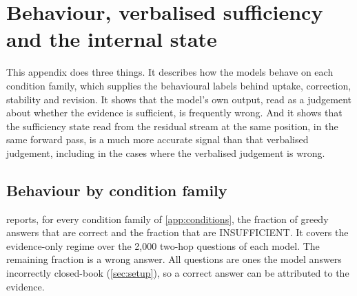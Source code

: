 \section{Behaviour, verbalised sufficiency and the internal state}
\label{app:behaviour}

This appendix does three things. It describes how the models behave on each condition family, which supplies the behavioural labels behind uptake, correction, stability and revision. It shows that the model's own output, read as a judgement about whether the evidence is sufficient, is frequently wrong. And it shows that the sufficiency state read from the residual stream at the same position, in the same forward pass, is a much more accurate signal than that verbalised judgement, including in the cases where the verbalised judgement is wrong.

\subsection{Behaviour by condition family}

 reports, for every condition family of \cref{app:conditions}, the fraction of greedy answers that are correct and the fraction that are INSUFFICIENT. It covers the evidence-only regime over the 2{,}000 two-hop questions of each model. The remaining fraction is a wrong answer. All questions are ones the model answers incorrectly closed-book (\cref{sec:setup}), so a correct answer can be attributed to the evidence.

\begin{table}[h]
\centering\small

\caption{Behaviour by condition family (evidence-only regime, 2{,}000 questions per model): fraction correct / fraction answering INSUFFICIENT. The remaining fraction is a wrong answer.}
\label{tab:behaviour}
\end{table}

